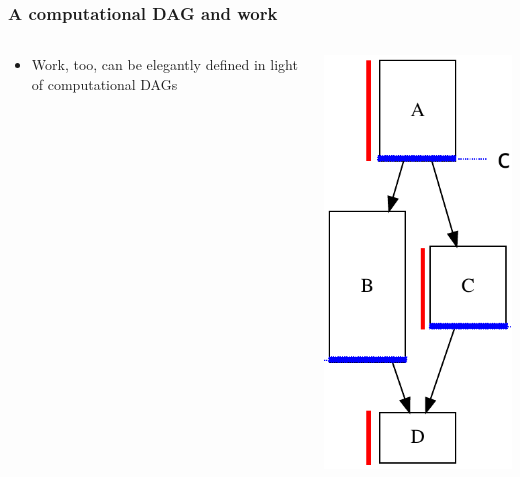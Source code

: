 \documentclass[12pt,dvipdfmx]{beamer}
\begin{document}
\begin{frame}[fragile]
\frametitle{A computational DAG and work}
\begin{columns}[t]
\begin{column}{0.65\textwidth}
\begin{itemize}
\item Work, too, can be elegantly defined in light of computational DAGs
\end{itemize}
\end{column}

\begin{column}{0.35\textwidth}
\begin{center}
\includegraphics[width=\textwidth]{out/pdf/svg/dag_work.pdf}

\end{center}
\end{column}
\end{columns}
\end{frame}
\end{document}
